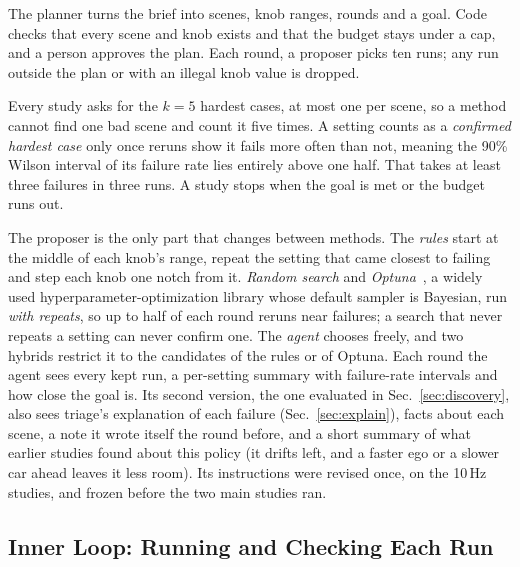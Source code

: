 \documentclass[conference]{IEEEtran}
\newcommand{\guide}[1]{}
\begin{document}
The planner turns the brief into scenes, knob ranges, rounds and a goal. Code checks that every scene and knob exists and that the budget stays under a cap, and a person approves the plan. Each round, a proposer picks ten runs; any run outside the plan or with an illegal knob value is dropped.

Every study asks for the $k=5$ hardest cases, at most one per scene, so a method cannot find one bad scene and count it five times. A setting counts as a \emph{confirmed hardest case} only once reruns show it fails more often than not, meaning the 90\% Wilson interval of its failure rate lies entirely above one half. That takes at least three failures in three runs. A study stops when the goal is met or the budget runs out.

The proposer is the only part that changes between methods. The \emph{rules} start at the middle of each knob's range, repeat the setting that came closest to failing and step each knob one notch from it. \emph{Random search} and \emph{Optuna}~\cite{akiba2019optuna}, a widely used hyperparameter-optimization library whose default sampler is Bayesian, run \emph{with repeats}, so up to half of each round reruns near failures; a search that never repeats a setting can never confirm one. The \emph{agent} chooses freely, and two hybrids restrict it to the candidates of the rules or of Optuna. Each round the agent sees every kept run, a per-setting summary with failure-rate intervals and how close the goal is. Its second version, the one evaluated in Sec.~\ref{sec:discovery}, also sees triage's explanation of each failure (Sec.~\ref{sec:explain}), facts about each scene, a note it wrote itself the round before, and a short summary of what earlier studies found about this policy (it drifts left, and a faster ego or a slower car ahead leaves it less room). Its instructions were revised once, on the 10\,Hz studies, and frozen before the two main studies ran.

\subsection{Inner Loop: Running and Checking Each Run}\label{sec:gate}
\guide{The upper row of the bottom band of Fig.~\ref{fig:system}. Each run passes checks before launch, runs in closed loop, and passes checks after it, in a fixed order; it is kept only if the requested scenario provably happened (read back from its logs) and its motion is physically plausible. Stress that code, not the model, decides that a run failed and names the reason. Define the outcome a kept run carries: a failure counts only if the policy is at fault after it takes over. Then the batch audit and how new checks are learned: the auditor flags runs that are wrong in the same way and proposes rules; code admits a rule only if it catches the flagged runs and fires on no clean run; a person enacts it; from then on it is checked on every run \emph{(Fig.~\ref{fig:system} does not show the auditor yet; add it when the figure is redrawn)}.}
\end{document}
